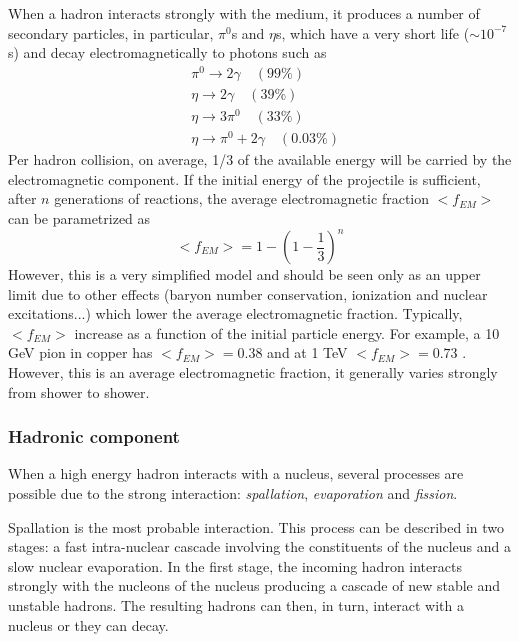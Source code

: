 When a hadron interacts strongly with the medium, it produces a number of secondary particles, in particular, $\pi^0$s and $\eta$s, which have a very short life ($\sim 10^{-7}$s) and decay electromagnetically to photons such as
\begin{equation*}
  \begin{aligned}
    &\pi^0 \rightarrow 2\gamma \quad (99\%)\\
    &\eta \rightarrow 2\gamma \quad (39\%)\\
    &\eta \rightarrow 3\pi^0 \quad (33\%)\\
    &\eta \rightarrow \pi^0 + 2\gamma \quad (0.03\%)
  \end{aligned}
\end{equation*}
Per hadron collision, on average, 1/3 of the available energy will be carried by the electromagnetic component. If the initial energy of the projectile is sufficient, after $n$ generations of reactions, the average electromagnetic fraction $<f_{EM}>$ can be parametrized as \cite{Wigmans:392793}
\begin{equation}
  <f_{EM}> = 1 - (1 - \frac{1}{3})^n
\end{equation}
However, this is a very simplified model and should be seen only as an upper limit due to other effects (baryon number conservation, ionization and nuclear excitations...) which lower the average electromagnetic fraction. Typically, $<f_{EM}>$ increase as a function of the initial particle energy. For example, a 10 GeV pion in copper has $<f_{EM}> = 0.38$ and at 1 TeV $<f_{EM}> = 0.73$ \cite{Wigmans:392793}. However, this is an average electromagnetic fraction, it generally varies strongly from shower to shower.

\subsubsection{Hadronic component}
\label{subsubsec:HadComp}

When a high energy hadron interacts with a nucleus, several processes are possible due to the strong interaction: \textit{spallation}, \textit{evaporation} and \textit{fission}.

Spallation is the most probable interaction. This process can be described in two stages: a fast intra-nuclear cascade involving the constituents of the nucleus and a slow nuclear evaporation. In the first stage, the incoming hadron interacts strongly with the nucleons of the nucleus producing a cascade of new stable and unstable hadrons. The resulting hadrons can then, in turn, interact with a nucleus or they can decay.

